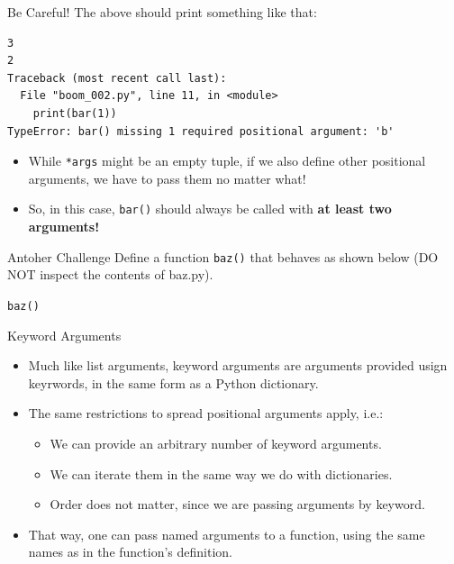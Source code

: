 \documentclass[aspectratio=169, 12pt, xcolor=table]{beamer}
\begin{document}
	\begin{frame}[fragile]{Be Careful!}
		The above should print something like that:
\begin{lstlisting}
3
2
Traceback (most recent call last):
  File "boom_002.py", line 11, in <module>
    print(bar(1))
TypeError: bar() missing 1 required positional argument: 'b'
\end{lstlisting}\pause
		\begin{itemize}
			\item While \texttt{*args} might be an empty tuple, if we also define other positional arguments, we have to pass them no matter what!\pause
			\item So, in this case, \texttt{bar()} should always be called with \textbf{at least two arguments!}
		\end{itemize}
	\end{frame}
	
	\begin{frame}{Antoher Challenge}
		Define a function \texttt{baz()} that behaves as shown below (DO NOT inspect the contents of baz.py).
		
	\end{frame}

	\begin{frame}{\texttt{baz()}}
		
	\end{frame}

	\begin{frame}{Keyword Arguments}
		\begin{itemize}
			\item Much like list arguments, keyword arguments are arguments provided usign keyrwords, in the same form as a Python dictionary.
			\item The same restrictions to spread positional arguments apply, i.e.:
			\begin{itemize}
				\item We can provide an arbitrary number of keyword arguments.
				\item We can iterate them in the same way we do with dictionaries.
				\item Order does not matter, since we are passing arguments by keyword.
			\end{itemize}
			\item That way, one can pass named arguments to a function, using the same names as in the function's definition.
		\end{itemize}
	\end{frame}
\end{document}
